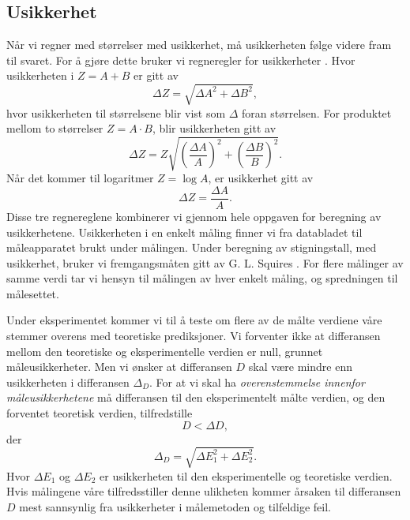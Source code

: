 \documentclass[%
 reprint,
 amsmath,amssymb,
 aps,
 norsk,
]{revtex4-1}
\begin{document}
\subsection{Usikkerhet}
Når vi regner med størrelser med usikkerhet, må usikkerheten følge videre fram til svaret. For å gjøre dette bruker vi regneregler for usikkerheter \cite{squires}. Hvor usikkerheten i $Z=A+B$ er gitt av
\begin{equation*}
  \Delta Z = \sqrt{\Delta A^2+\Delta B^2},
\end{equation*}
hvor usikkerheten til størrelsene blir vist som $\Delta$ foran størrelsen. For produktet mellom to størrelser $Z=A\cdot B$, blir usikkerheten gitt av
\begin{equation*}
  \Delta Z = Z\sqrt{\left(\frac{\Delta A}{A}\right)^2 + \left(\frac{\Delta B}{B}\right)^2}.
\end{equation*}
Når det kommer til logaritmer $Z=\log{A}$, er usikkerhet gitt av
\begin{equation*}
  \Delta Z = \frac{\Delta A}{A}.
\end{equation*}
Disse tre regnereglene kombinerer vi gjennom hele oppgaven for beregning av usikkerhetene. Usikkerheten i en enkelt måling finner vi fra databladet til måleapparatet brukt under målingen. Under beregning av stigningstall, med usikkerhet, bruker vi fremgangsmåten gitt av G. L. Squires \cite{squires}. For flere målinger av samme verdi tar vi hensyn til målingen av hver enkelt måling, og spredningen til målesettet.
\par
Under eksperimentet kommer vi til å teste om flere av de målte verdiene våre stemmer overens med teoretiske prediksjoner. Vi forventer ikke at differansen mellom den teoretiske og eksperimentelle verdien er null, grunnet måleusikkerheter. Men vi ønsker at differansen $D$ skal være mindre enn usikkerheten i differansen $\Delta_D$. For at vi skal ha \textit{overenstemmelse innenfor måleusikkerhetene} må differansen til den eksperimentelt målte verdien, og den forventet teoretisk verdien, tilfredstille
\begin{equation}
  D < \Delta D, \label{usikk1}
\end{equation}
der
\begin{equation}
  \Delta_D = \sqrt{\Delta E_1^2 + \Delta E_2^2}. \label{usikk2}
\end{equation}
Hvor $\Delta E_1$ og $\Delta E_2$ er usikkerheten til den eksperimentelle og teoretiske verdien.
Hvis målingene våre tilfredsstiller denne ulikheten kommer årsaken til differansen $D$ mest sannsynlig fra usikkerheter i målemetoden og tilfeldige feil.
\end{document}
